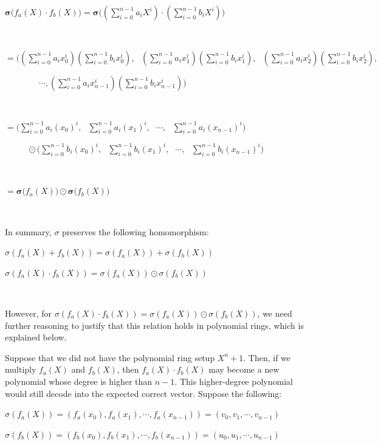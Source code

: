 $\bm{\sigma(}f_a(X)\cdot f_b(X)\bm{)} = \bm{\sigma\bigg(}\left(\sum\limits_{i=0}^{n-1}a_iX^i\right)\cdot\left( \sum\limits_{i=0}^{n-1}b_iX^i\right)\bm{\bigg)}$

$ $

$= \Bigg( \left(\sum\limits_{i=0}^{n-1}a_ix_0^i\right)\left( \sum\limits_{i=0}^{n-1}b_ix_0^i\right), \text{ }
\left(\sum\limits_{i=0}^{n-1}a_ix_1^i\right)\left( \sum\limits_{i=0}^{n-1}b_ix_1^i\right), \text{ }
\left(\sum\limits_{i=0}^{n-1}a_ix_2^i\right)\left( \sum\limits_{i=0}^{n-1}b_ix_2^i\right),$

$  \text{ } \text{ } \text{ } \text{ } \text{ } \text{ }
\cdots,
\left(\sum\limits_{i=0}^{n-1}a_ix_{n-1}^i\right)\left( \sum\limits_{i=0}^{n-1}b_ix_{n-1}^i\right)
\Bigg)$

$ $

$ = \Bigg(\sum\limits_{i=0}^{n-1}a_i(x_0)^i, \text{ } \sum\limits_{i=0}^{n-1}a_i(x_1)^i, \text{ } \cdots, \text{ } \sum\limits_{i=0}^{n-1}a_i(x_{n-1})^i\Bigg)$

$  \text{ } \text{ } \text{ } \text{ }  \odot  \Bigg(\sum\limits_{i=0}^{n-1}b_i(x_0)^i, \text{ } 
\sum\limits_{i=0}^{n-1}b_i(x_1)^i, \text{ }
\cdots, \text{ } \sum\limits_{i=0}^{n-1}b_i(x_{n-1})^i\Bigg)$

$ $

$= \bm{\sigma(}f_a(X)\bm{)} \odot \bm{\sigma(}f_b(X)\bm{)}$

$ $

In summary, $\sigma$ preserves the following homomorphism:

$\sigma(f_a(X) + f_b(X)) = \sigma(f_a(X)) + \sigma(f_b(X))$

$\sigma(f_a(X) \cdot f_b(X)) = \sigma(f_a(X)) \odot \sigma(f_b(X))$

$ $

However, for $\sigma(f_a(X) \cdot f_b(X)) = \sigma(f_a(X)) \odot \sigma(f_b(X))$, we need further reasoning to justify that this relation holds in polynomial rings, which is explained below.


 Suppose that we did not have the polynomial ring setup $X^n + 1$. Then, if we multiply $f_a(X)$ and $f_b(X)$, then $f_a(X) \cdot f_b(X)$ may become a new polynomial whose degree is higher than $n-1$. This higher-degree polynomial would still decode into the expected correct vector. Suppose the following:

$\sigma(f_a(X)) = (f_a(x_0), f_a(x_1), \cdots, f_a(x_{n-1})) = (v_0, v_1, \cdots, v_{n-1})$

$\sigma(f_b(X)) = (f_b(x_0), f_b(x_1), \cdots, f_b(x_{n-1})) = (u_0, u_1, \cdots, u_{n-1})$

